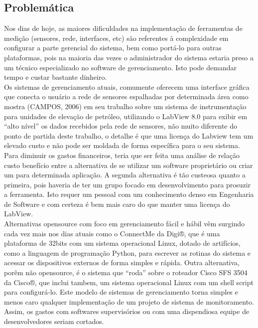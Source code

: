 \documentclass[a4paper, 12pt]{article}
\begin{document}
\subsection{Problemática}
\indent\indent Nos dias de hoje, as maiores dificuldades na implementação de ferramentas de medição (sensores, rede, interfaces, etc) são referentes à 
complexidade em configurar a parte gerencial do sistema, bem como portá-lo para outras plataformas, pois na maioria das vezes o administrador do 
sistema estaria preso a um técnico especializado no software de gerenciamento. Isto pode demandar tempo e custar bastante dinheiro.
\\
\indent Os sistemas de gerenciamento atuais, comumente oferecem uma interface gráfica que conecta o usuário a rede de sensores espalhadas por determinada 
área como mostra (CAMPOS, 2006) em seu trabalho sobre um sistema de instrumentação para unidades de elevação de petróleo, utilizando o LabView 8.0 para 
exibir em “alto nível” os dados recebidos pela rede de sensores, não muito diferente do ponto de partida deste trabalho, o detalhe é que uma licença do 
Labview  tem um elevado custo e não pode ser moldada de forma específica para o seu sistema. 
\\
\indent Para diminuir os gastos financeiros, teria que ser feita uma análise de relação custo benefício entre a alternativa de se utilizar um software 
proprietário ou criar um para determinada aplicação. A segunda alternativa é tão custeosa quanto a primeira, pois haveria de ter um grupo focado em 
desenvolvimento para prosuzir a ferramenta. Isto requer um pessoal com um conhecimento denso em Engenharia de Software e com certeza é bem mais caro do 
que manter uma licença do LabView. 
\\
\indent Alternativas opensource com foco em gerenciamento fácil e hábil vêm surgindo cada vez mais nos dias atuais como o ConnectMe da Digi®, que é uma 
plataforma de 32bits com um sistema operacional Linux, dotado de artifícios, como a linguagem de programação Python, para escrever as rotinas do sistema 
e acessar os dispositivos externos de forma simples e rápida. Outra alternativa, porêm não opensource, é o sistema que “roda” sobre o roteador 
Cisco SFS 3504 da Cisco®, que inclui tambem, um sistema operacional Linux com um shell script para configurá-lo. Este modelo de sistemas de gerenciamento 
torna simples e menos caro qualquer implementação de um projeto de sistema de monitoramento. Assim, os gastos com softwares supervisórios ou com uma 
dispendiosa equipe de desenvolvedores seriam cortados.
\end{document}
